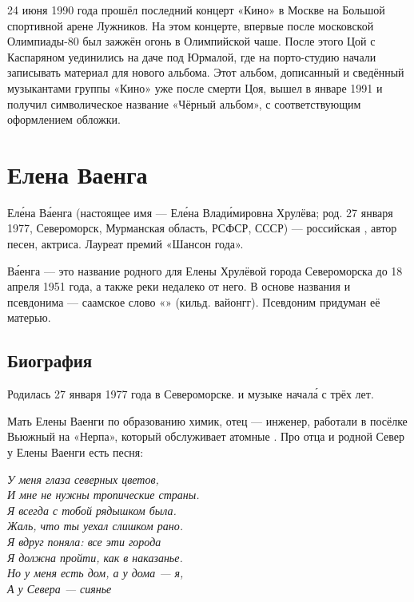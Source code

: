 24 июня 1990 года прошёл последний концерт «Кино» в Москве на Большой спортивной арене Лужников. На этом концерте, впервые после московской Олимпиады-80 был зажжён огонь в Олимпийской чаше. После этого Цой с Каспаряном уединились на даче под Юрмалой, где на порто-студию начали записывать материал для нового альбома. Этот альбом, дописанный и сведённый музыкантами группы «Кино» уже после смерти Цоя, вышел в январе 1991 и получил символическое название «Чёрный альбом», с соответствующим оформлением обложки.

\section{Елена Ваенга}
Ел\'{е}на В\'{а}енга (настоящее имя --- Ел\'{е}на Влад\'{и}мировна Хрулёва; род. 27 января 1977, Североморск, Мурманская область, РСФСР, СССР) --- российская , автор песен, актриса. Лауреат премий «Шансон года».

В\'{а}енга --- это название родного для Елены Хрулёвой города Североморска до 18 апреля 1951 года, а также реки недалеко от него. В основе названия и псевдонима --- саамское слово «» (кильд. вайонгг). Псевдоним придуман её матерью.

\subsection{Биография}
Родилась 27 января 1977 года в Североморске.  и  музыке начал\'{а} с трёх лет.

Мать Елены Ваенги по образованию химик, отец --- инженер, работали в посёлке Вьюжный на  «Нерпа», который обслуживает атомные . Про отца и родной Север у Елены Ваенги есть песня:

\begin{fancyquotes}
    {\it У меня глаза северных цветов,\\
        И мне не нужны тропические страны.\\
        Я всегда с тобой рядышком была.\\
        Жаль, что ты уехал слишком рано.\\
        Я вдруг поняла: все эти города\\
        Я должна пройти, как в наказанье.\\
        Но у меня есть дом, а у дома --- я,\\
        А у Севера --- сиянье}
\end{fancyquotes}


